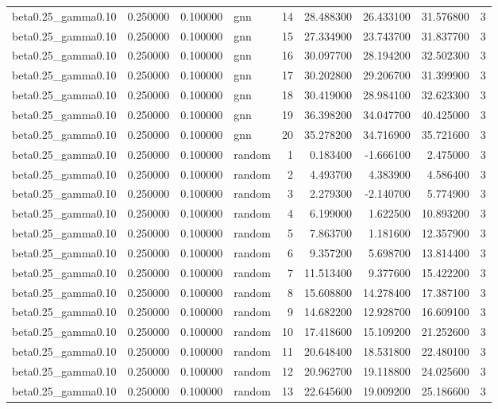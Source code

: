 \begin{tabular}{lrrlrrrrr}
beta0.25\_gamma0.10 & 0.250000 & 0.100000 & gnn & 14 & 28.488300 & 26.433100 & 31.576800 & 3 \\
beta0.25\_gamma0.10 & 0.250000 & 0.100000 & gnn & 15 & 27.334900 & 23.743700 & 31.837700 & 3 \\
beta0.25\_gamma0.10 & 0.250000 & 0.100000 & gnn & 16 & 30.097700 & 28.194200 & 32.502300 & 3 \\
beta0.25\_gamma0.10 & 0.250000 & 0.100000 & gnn & 17 & 30.202800 & 29.206700 & 31.399900 & 3 \\
beta0.25\_gamma0.10 & 0.250000 & 0.100000 & gnn & 18 & 30.419000 & 28.984100 & 32.623300 & 3 \\
beta0.25\_gamma0.10 & 0.250000 & 0.100000 & gnn & 19 & 36.398200 & 34.047700 & 40.425000 & 3 \\
beta0.25\_gamma0.10 & 0.250000 & 0.100000 & gnn & 20 & 35.278200 & 34.716900 & 35.721600 & 3 \\
beta0.25\_gamma0.10 & 0.250000 & 0.100000 & random & 1 & 0.183400 & -1.666100 & 2.475000 & 3 \\
beta0.25\_gamma0.10 & 0.250000 & 0.100000 & random & 2 & 4.493700 & 4.383900 & 4.586400 & 3 \\
beta0.25\_gamma0.10 & 0.250000 & 0.100000 & random & 3 & 2.279300 & -2.140700 & 5.774900 & 3 \\
beta0.25\_gamma0.10 & 0.250000 & 0.100000 & random & 4 & 6.199000 & 1.622500 & 10.893200 & 3 \\
beta0.25\_gamma0.10 & 0.250000 & 0.100000 & random & 5 & 7.863700 & 1.181600 & 12.357900 & 3 \\
beta0.25\_gamma0.10 & 0.250000 & 0.100000 & random & 6 & 9.357200 & 5.698700 & 13.814400 & 3 \\
beta0.25\_gamma0.10 & 0.250000 & 0.100000 & random & 7 & 11.513400 & 9.377600 & 15.422200 & 3 \\
beta0.25\_gamma0.10 & 0.250000 & 0.100000 & random & 8 & 15.608800 & 14.278400 & 17.387100 & 3 \\
beta0.25\_gamma0.10 & 0.250000 & 0.100000 & random & 9 & 14.682200 & 12.928700 & 16.609100 & 3 \\
beta0.25\_gamma0.10 & 0.250000 & 0.100000 & random & 10 & 17.418600 & 15.109200 & 21.252600 & 3 \\
beta0.25\_gamma0.10 & 0.250000 & 0.100000 & random & 11 & 20.648400 & 18.531800 & 22.480100 & 3 \\
beta0.25\_gamma0.10 & 0.250000 & 0.100000 & random & 12 & 20.962700 & 19.118800 & 24.025600 & 3 \\
beta0.25\_gamma0.10 & 0.250000 & 0.100000 & random & 13 & 22.645600 & 19.009200 & 25.186600 & 3 \\

\end{tabular}

